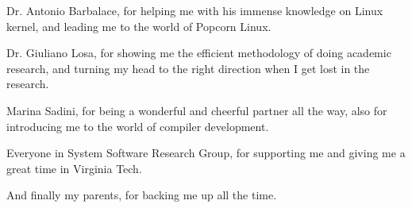\documentclass[12pt]{report}
\begin{document}
Dr. Antonio Barbalace, for helping me with his immense knowledge on Linux kernel, and leading me to the world of Popcorn Linux.

Dr. Giuliano Losa, for showing me the efficient methodology of doing academic research, and turning my head to the right direction when I get lost in the research.

Marina Sadini, for being a wonderful and cheerful partner all the way, also for introducing me to the world of compiler development.

Everyone in System Software Research Group, for supporting me and giving me a great time in Virginia Tech.

And finally my parents, for backing me up all the time.

\tableofcontents
\pagebreak

\listoffigures
\pagebreak

\listoftables
\pagebreak

\pagestyle{myheadings}

\newcommand{\detstart}{\_\_det\_start}
\newcommand{\detend}{\_\_det\_end}
\newcommand{\dettick}{\_\_det\_tick}












%
\end{document}
